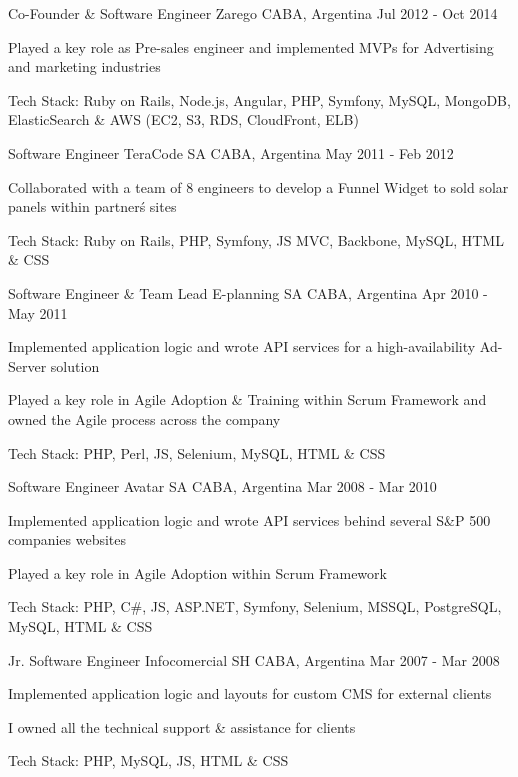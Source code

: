 \begin{cventries}
  \cventry
    {Co-Founder \& Software Engineer}
    {Zarego}
    {CABA, Argentina}
    {Jul 2012 - Oct 2014}
    {
      \begin{cvitems}
        \item {Played a key role as Pre-sales engineer and implemented MVPs for Advertising and marketing industries}
        \item {Tech Stack: Ruby on Rails, Node.js, Angular, PHP, Symfony, MySQL, MongoDB, ElasticSearch \& AWS (EC2, S3, RDS, CloudFront, ELB)}
      \end{cvitems}
    }

  \cventry
    {Software Engineer}
    {TeraCode SA}
    {CABA, Argentina}
    {May 2011 - Feb 2012}
    {
      \begin{cvitems}
        \item {Collaborated with a team of 8 engineers to develop a Funnel Widget to sold solar panels within partner\'s sites}
        \item {Tech Stack: Ruby on Rails, PHP, Symfony, JS MVC, Backbone, MySQL, HTML \& CSS}
      \end{cvitems}
    }

  \cventry
    {Software Engineer \& Team Lead}
    {E-planning SA}
    {CABA, Argentina}
    {Apr 2010 - May 2011}
    {
      \begin{cvitems}
        \item {Implemented application logic and wrote API services for a high-availability Ad-Server solution}
        \item {Played a key role in Agile Adoption \& Training within Scrum Framework and owned the Agile process across the company}
        \item {Tech Stack: PHP, Perl, JS, Selenium, MySQL, HTML \& CSS}
      \end{cvitems}
    }

  \cventry
    {Software Engineer}
    {Avatar SA}
    {CABA, Argentina}
    {Mar 2008 - Mar 2010}
    {
      \begin{cvitems}
        \item {Implemented application logic and wrote API services behind several S\&P 500 companies websites}
        \item {Played a key role in Agile Adoption within Scrum Framework}
        \item {Tech Stack: PHP, C\#, JS, ASP.NET, Symfony, Selenium, MSSQL, PostgreSQL, MySQL, HTML \& CSS}
      \end{cvitems}
    }

  \cventry
    {Jr. Software Engineer}
    {Infocomercial SH}
    {CABA, Argentina}
    {Mar 2007 - Mar 2008}
    {
      \begin{cvitems}
        \item {Implemented application logic and layouts for custom CMS for external clients}
        \item {I owned all the technical support \& assistance for clients}
        \item {Tech Stack: PHP, MySQL, JS, HTML \& CSS}
      \end{cvitems}
    }

\end{cventries}
